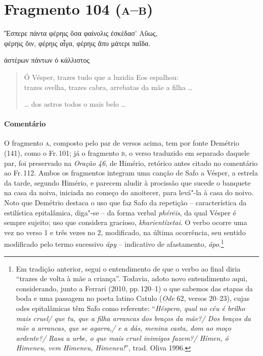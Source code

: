 \pagebreak
\section{Fragmento 104 (\textsc{a--b})}

\begin{gkverse}
Ἔσπερε πάντα φέρηις ὄσα φαίνολις ἐσκέδασ’ Αὔως,\\
      φέρηις ὄιν, φέρηις αἶγα, φέρηις ἄπυ μάτερι παῖδα.

\hspace*{35mm}

ἀστέρων πάντων ὀ κάλλιστος
\end{gkverse}

\begin{verse}
Ó Vésper, trazes tudo que a luzidia Eos espalhou:\\
trazes ovelha, trazes cabra, arrebatas da mãe a filha \ldots{}

\hspace*{35mm}

\ldots{} dos astros todos o mais belo \ldots{} 
\end{verse}

\medskip

{\paragraph{Comentário} O fragmento \textsc{a}, composto pelo par de versos acima, tem por fonte Demétrio (141),
como o Fr.\,101; já o fragmento \textsc{b}, o verso traduzido em separado daquele par,
foi preservado na \textit{Oração 46}, de Himério, retórico antes citado no comentário ao Fr.\,112.
Ambos os fragmentos integram uma canção de Safo a Vésper, a estrela da tarde,
segundo Himério, e parecem aludir à procissão que sucede o banquete na casa da
noiva, iniciada no começo do anoitecer, para levá"-la à casa do noivo.
Noto que Demétrio destaca o uso que faz Safo da repetição -- característica da estilística epitalâmica, diga"-se -- da forma verbal \textit{phérēis}, da qual Vésper é sempre sujeito; uso que considera gracioso, \textit{kharientízetai}. O verbo ocorre uma vez no verso 1 e três vezes no 2, modificado, na última ocorrência, seu sentido modificado pelo termo sucessivo \textit{ápy} -- indicativo de afastamento, \textit{ápo}.\footnote{Em tradição anterior, segui o entendimento de que o verbo ao final diria ``trazes de volta à mãe a criança''. Todavia, adoto novo entendimento aqui, considerando, junto a Ferrari (2010, pp.\,120--1) o que sabemos das etapas da boda e uma passagem no poeta latino Catulo (\textit{Ode} 62, versos 20--23), cujas odes epitalâmicas têm Safo como referente: ``\textit{Héspero, qual no céu é brilho mais cruel/ que tu, que a filha arrancas dos braços da mãe?/ Dos braços da mãe a arrancas, que se agarra,/ e a dás, menina casta, dom ao moço ardente?/ Rasa a urbe, o que mais cruel inimigos fazem?/ Hímen, ó Himeneu, vem Himeneu, Himeneu!}'', trad. Oliva 1996.} }




